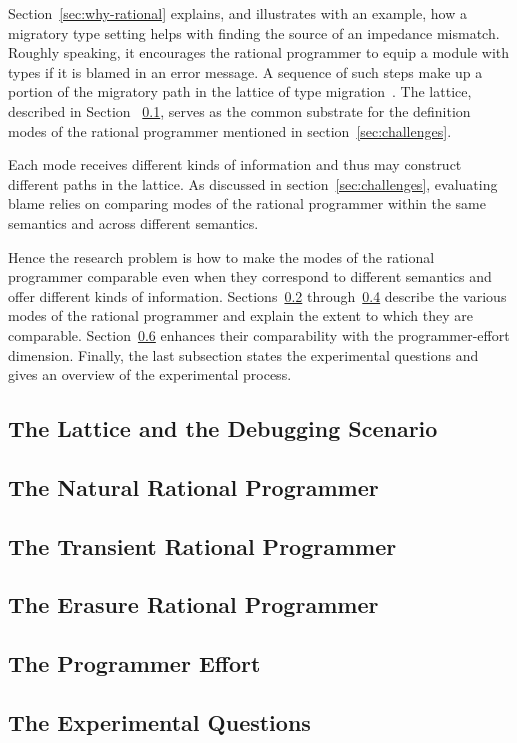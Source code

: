 
Section~\ref{sec:why-rational} explains, and illustrates with an example,
how a migratory type setting helps with finding the source of an impedance
mismatch. Roughly speaking, it encourages the rational programmer to
equip a module with types if it is blamed in an error message. A sequence
of such steps make up a portion of the migratory path in the lattice of
type migration~\cite{tfgnvf-popl-2016}. The lattice, described in Section
~\ref{sub:stuff},  serves as the common substrate for the definition modes
of the rational programmer mentioned in section~\ref{sec:challenges}. 

Each mode receives different kinds of information and thus may construct
different paths in the lattice. As discussed in section~\ref{sec:challenges},
evaluating blame relies on comparing modes of the rational programmer
within the same semantics and across different semantics.  

Hence the research problem is how to make the modes of the rational programmer
comparable even when they correspond to different semantics and offer different kinds of information. Sections~\ref{sub:natural}
through~\ref{sub:erasure} describe the various modes of the rational programmer and explain
the extent to which they are comparable. Section~\ref{sub:experiment}
enhances their comparability with the programmer-effort dimension. Finally, the last
subsection states the experimental questions and gives an overview of the
experimental process. 

\def\rsub#1#2{\subsection{#2} \label{sub:#1} }

\rsub{stuff}     {The Lattice and the Debugging Scenario} 
\rsub{natural}   {The Natural Rational Programmer} 
\rsub{transient} {The Transient Rational Programmer} 
\rsub{erasure}   {The Erasure Rational Programmer} 
\rsub{effort}    {The Programmer Effort} \label{subsec:effort}
\rsub{experiment}{The Experimental Questions} 
